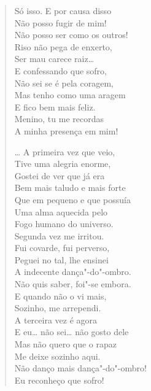 {\begin{verse}
Só isso. E por causa disso\\
Não posso fugir de mim!\\
Não posso ser como os outros!\\
Riso não pega de enxerto,\\
Ser mau carece raiz\ldots{}\\
E confessando que sofro,\\
Não sei se é pela coragem,\\
Mas tenho como uma aragem\\
E fico bem mais feliz.\\
Menino, tu me recordas\\
A minha presença em mim!

\ldots{} A primeira vez que veio,\\
Tive uma alegria enorme,\\
Gostei de ver que já era\\
Bem mais taludo e mais forte\\
Que em pequeno e que possuía\\
Uma alma aquecida pelo\\
Fogo humano do universo.\\
Segunda vez me irritou.\\
Fui covarde, fui perverso,\\
Peguei no tal, lhe ensinei\\
A indecente dança"-do"-ombro.\\
Não quis saber, foi"-se embora.\\
E quando não o vi mais,\\
Sozinho, me arrependi.\\
A terceira vez é agora\\
E eu\ldots{} não sei\ldots{} não gosto dele\\
Mas não quero que o rapaz\\
Me deixe sozinho aqui.\\
Não danço mais dança"-do"-ombro!\\
Eu reconheço que sofro!


\end{verse}}
